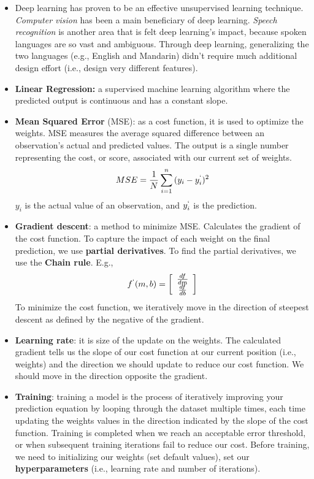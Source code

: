 \documentclass[]{article}
\begin{document}
\begin{itemize}
\begin{itemize}
		\item Deep learning has proven to be an effective unsupervised learning technique. \textit{Computer vision} has been a main beneficiary of deep learning. \textit{Speech recognition} is another area that is felt deep learning's impact, because spoken languages are so vast and ambiguous. Through deep learning, generalizing the two languages (e.g., English and Mandarin) didn't require much additional design effort (i.e., design very different features).
		\item \textbf{Linear Regression:} a supervised machine learning algorithm where the predicted output is continuous and has a constant slope.
		\item \textbf{Mean Squared Error} (MSE): as a cost function, it is used to optimize the weights. MSE measures the average squared difference between an observation's actual and predicted values. The output is a single number representing the cost, or score, associated with our current set of weights.
		\begin{equation}
		MSE = \frac{1}{N} \sum_{i=1}^{n}{(y_i-y^`_i)^2}
		\end{equation}
		$y_i$ is the actual value of an observation, and $y^`_i$ is the prediction.
		\item \textbf{Gradient descent}: a method to minimize MSE. Calculates the gradient of the cost function. To capture the impact of each weight on the final prediction, we use \textbf{partial derivatives}. To find the partial derivatives, we use the \textbf{Chain rule}. E.g.,
		\begin{equation}
		f^`(m,b)=\left[
		\begin{array}{c}
		\frac{df}{dm} \\
		\frac{df}{db}
		\end{array}
		\right]
		\end{equation}
		To minimize the cost function, we iteratively move in the direction of steepest descent as defined by the negative of the gradient.
		
		\item \textbf{Learning rate}: it is size of the update on the weights. The calculated gradient tells us the slope of our cost function at our current position (i.e., weights) and the direction we should update to reduce our cost function. We should move in the direction opposite the gradient.
		
		\item \textbf{Training}: training a model is the process of iteratively improving your prediction equation by looping through the dataset multiple times, each time updating the weights values in the direction indicated by the slope of the cost function. Training is completed when we reach an acceptable error threshold, or when subsequent training iterations fail to reduce our cost. Before training, we need to initializing our weights (set default values), set our \textbf{hyperparameters} (i.e., learning rate and number of iterations).
		

\end{itemize}
\end{itemize}
\end{document}
